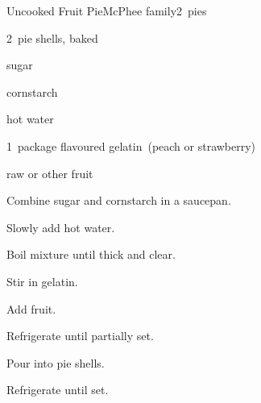 \begin{recipe}{Uncooked Fruit Pie}{McPhee family}{2~pies}

\begin{ingredients}
\item 2~pie shells, baked
\item {} sugar
\item {} cornstarch
\item \C{1\half} hot water
\item 1~package flavoured gelatin~(peach or strawberry)
\item {} raw  or other fruit
\end{ingredients}

\begin{directions}
\item Combine sugar and cornstarch in a saucepan.
\item Slowly add hot water.
\item Boil mixture until thick and clear.
\item Stir in gelatin.
\item Add fruit.
\item Refrigerate until partially set.
\item Pour into pie shells.
\item Refrigerate until set.
\end{directions}

\end{recipe}
